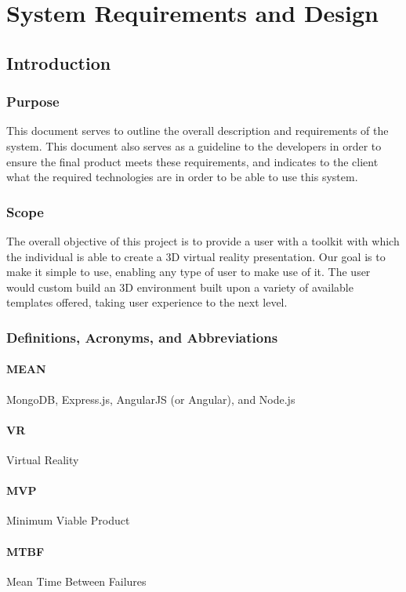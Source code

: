 
\section{System Requirements and Design}

\subsection{Introduction}

	\subsubsection{Purpose}
	This document serves to outline the overall description and requirements of 	the system. This document also serves as a guideline to the developers in 		order to ensure the final product meets these requirements, and indicates 		to the client what the required technologies are in order to be able to use 	this system.

	\subsubsection{Scope}

	The overall objective of this project is to provide a user with a toolkit with which the individual is able to create a 3D virtual reality presentation. Our goal is to make it simple to use, enabling any type of user to make use of it. The user would custom build an 3D environment built upon a variety of available templates offered, taking user experience to the next level.

	\subsubsection{Definitions, Acronyms, and Abbreviations}
			\paragraph{MEAN}	MongoDB, Express.js, AngularJS (or Angular), and Node.js
			\paragraph{VR}	Virtual Reality
			\paragraph{MVP} Minimum Viable Product
			\paragraph{MTBF} Mean Time Between Failures

